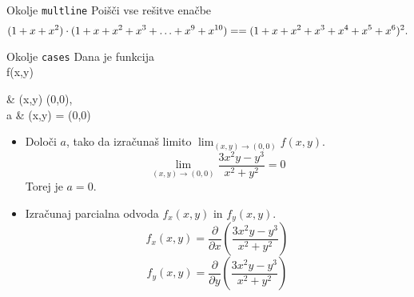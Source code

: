 \begin{frame}{Okolje \texttt{multline}}
	Poišči vse rešitve enačbe
	\[
	(1+x+x^2) \cdot (1+x+x^2+x^3+\ldots+x^9+x^{10}) \\= 
	=(1+x+x^2+x^3+x^4+x^5+x^6)^2.\\
	\]
\end{frame}

\begin{frame}{Okolje \texttt{cases}}
	Dana je funkcija
	\[\]
	f(x,y)
	\begin{cases}
		 & (x,y) \neq (0,0),\\
		a & (x,y) = (0,0)
	\end{cases}
	\]
	

	\begin{itemize}
		\item Določi $a$, tako da izračunaš limito \( \lim_{(x,y)\to(0,0)} f(x,y) \).
		\[
		\lim_{(x,y)\to(0,0)} \frac{3x^2y-y^3}{x^2+y^2} = 0
		\]
		Torej je \( a = 0 \).

		\item Izračunaj parcialna odvoda $f_x(x,y)$ in $f_y(x,y)$.
		\[
		f_x(x,y) = \frac{\partial}{\partial x} \left( \frac{3x^2y-y^3}{x^2+y^2} \right)
		\]
		\[
		f_y(x,y) = \frac{\partial}{\partial y} \left( \frac{3x^2y-y^3}{x^2+y^2} \right)
		\]
	\end{itemize}
\end{frame}